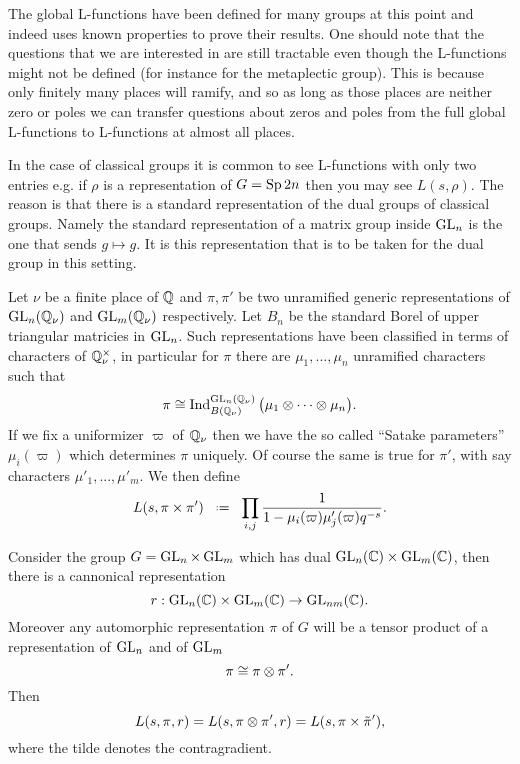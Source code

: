 \begin{remark}
    The global L-functions have been defined for many groups at this point and indeed \cite{jiangPolesCertainResidual2013} uses known properties to prove their results. One should note that the questions that we are interested in are still tractable even though the L-functions might not be defined (for instance for the metaplectic group). This is because only finitely many places will ramify, and so as long as those places are neither zero or poles we can transfer questions about zeros and poles from the full global L-functions to L-functions at almost all places. 
\end{remark}

\begin{example}
    In the case of classical groups it is common to see L-functions with only two entries e.g. if \(\rho\) is a representation of \(G = \operatorname{Sp}{2n}\) then you may see 
    \(L(s, \rho).\)
    The reason is that there is a standard representation of the dual groups of classical groups. Namely the standard representation of a matrix group inside \(\operatorname{GL}_n\) is the one that sends \(g\mapsto g\). It is this representation that is to be taken for the dual group in this setting.
\end{example}

\begin{example}
    Let \(\nu\) be a finite place of \(\Q\) and \(\pi, \pi'\) be two unramified generic representations of \(\GL_n(\Q_\nu)\) and \(\GL_m(\Q_\nu)\) respectively. Let \(B_n\) be the standard Borel of upper triangular matricies in \(\operatorname{GL}_n\). Such representations have been classified 
    in terms of characters of \(\Q^\times_\nu\), in particular for \(\pi\) there are \(\mu_1, ..., \mu_n\) unramified characters such that 
    \[\pi \cong \Ind_{B(\Q_\nu)}^{\GL_n(\Q_\nu)} \big(\mu_1 \tensor \cdots \tensor \mu_n\big).\]
    If we fix a uniformizer \(\varpi\) of \(\Q_\nu\) then we have the so called ``Satake parameters'' \(\mu_i(\varpi)\) which determines \(\pi\) uniquely. Of course the same is true for \(\pi'\), with say characters \(\mu'_1, ..., \mu'_m\). We then define
    \[L(s, \pi\times \pi') \defeq \prod_{i,j} \frac{1}{1-\mu_i(\varpi)\mu'_j(\varpi)q^{-s}}.\]

    Consider the group \(G = \operatorname{GL}_n\times \operatorname{GL}_m\) which has dual \(\GL_n(\C) \times \GL_m(\C)\), then there is a cannonical representation 
    \[r:\GL_n(\C) \times \GL_m(\C) \to \GL_{nm}(\C). \]
    Moreover any automorphic representation \(\pi\) of \(G\) will be a tensor product of a representation of \(\operatorname{GL}_n\) and of \(\operatorname{GL}_m\)
    \[\pi \cong \pi \otimes \pi'.\]
    Then 
    \[L(s, \pi, r) = L(s, \pi\otimes \pi', r) = L(s, \pi \times \tilde{\pi}'),\]
    where the tilde denotes the contragradient.
\end{example}

